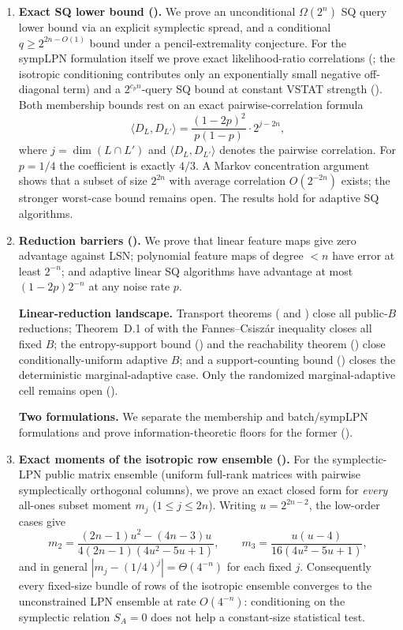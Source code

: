 \documentclass[11pt,a4paper]{article}
\theoremstyle{plain}
\theoremstyle{definition}
\begin{document}
\begin{enumerate}
    \item \textbf{Exact SQ lower bound ().} We prove an unconditional $\Omega(2^n)$ SQ query lower bound via an explicit symplectic spread, and a conditional $q \geq 2^{2n - O(1)}$ bound under a pencil-extremality conjecture. For the sympLPN formulation itself we prove exact likelihood-ratio correlations (; the isotropic conditioning contributes only an exponentially small negative off-diagonal term) and a $2^{c_p n}$-query SQ bound at constant VSTAT strength (). Both membership bounds rest on an exact pairwise-correlation formula
    \[
    \langle D_L, D_{L'} \rangle = \frac{(1-2p)^2}{p(1-p)} \cdot 2^{j-2n},
    \]
    where $j = \dim(L \cap L')$ and $\langle D_L, D_{L'} \rangle$ denotes the pairwise correlation. For $p=1/4$ the coefficient is exactly $4/3$. A Markov concentration argument shows that a subset of size $2^{2n}$ with average correlation $O(2^{-2n})$ exists; the stronger worst-case bound remains open. The results hold for adaptive SQ algorithms.

    \item \textbf{Reduction barriers ().} We prove that linear feature maps give zero advantage against LSN; polynomial feature maps of degree $< n$ have error at least $2^{-n}$; and adaptive linear SQ algorithms have advantage at most $(1-2p)2^{-n}$ at any noise rate $p$.
    
    \textbf{Linear-reduction landscape.} Transport theorems ( and ) close all public-$B$ reductions; Theorem~D.1 of \cite{LPQR26} with the Fannes--Csisz\'ar inequality closes all fixed $B$; the entropy-support bound () and the reachability theorem () close conditionally-uniform adaptive $B$; and a support-counting bound () closes the deterministic marginal-adaptive case. Only the randomized marginal-adaptive cell remains open ().
    
    \textbf{Two formulations.} We separate the membership and batch/sympLPN formulations and prove information-theoretic floors for the former ().

    \item \textbf{Exact moments of the isotropic row ensemble ().} For the symplectic-LPN public matrix ensemble (uniform full-rank matrices with pairwise symplectically orthogonal columns), we prove an exact closed form for \emph{every} all-ones subset moment $m_j$ ($1\le j\le 2n$). Writing $u = 2^{2n-2}$, the low-order cases give
    \[
    m_2 = \frac{(2n-1)u^2-(4n-3)u}{4(2n-1)(4u^2-5u+1)}, \qquad
    m_3 = \frac{u(u-4)}{16(4u^2-5u+1)},
    \]
    and in general $|m_j - (1/4)^j| = \Theta(4^{-n})$ for each fixed $j$. Consequently every fixed-size bundle of rows of the isotropic ensemble converges to the unconstrained LPN ensemble at rate $O(4^{-n})$: conditioning on the symplectic relation $S_A=0$ does not help a constant-size statistical test.


\end{enumerate}
\end{document}
